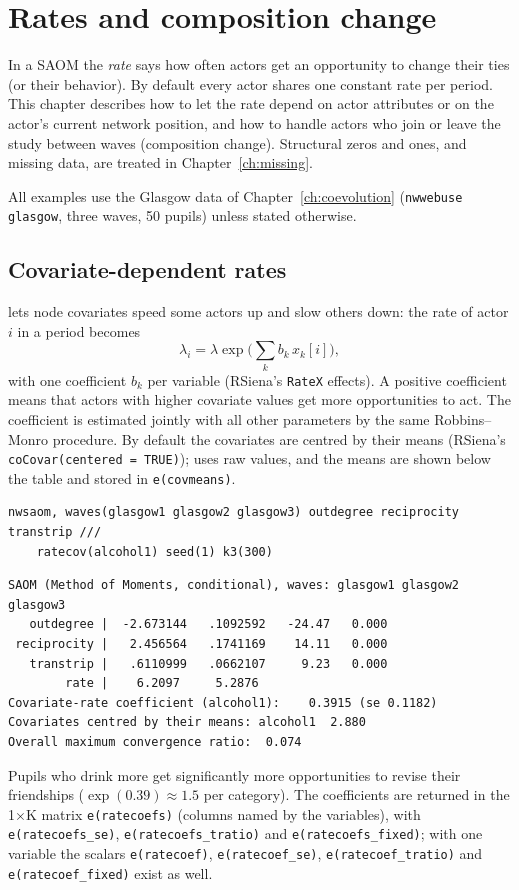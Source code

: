 \chapter{Rates and composition change}\label{ch:rates}
\begingroup\raggedright\sloppy

In a SAOM the \emph{rate} says how often actors get an opportunity to change their ties (or their behavior). By default every actor shares one constant rate per period. This chapter describes how to let the rate depend on actor attributes or on the actor's current network position, and how to handle actors who join or leave the study between waves (composition change). Structural zeros and ones, and missing data, are treated in Chapter~\ref{ch:missing}.

All examples use the Glasgow data of Chapter~\ref{ch:coevolution} (\texttt{nwwebuse glasgow}, three waves, 50 pupils) unless stated otherwise.

\section{Covariate-dependent rates}\label{sec:ratecov}

 lets node covariates speed some actors up and slow others down: the rate of actor $i$ in a period becomes
\[
  \lambda_i = \lambda \exp\Big(\sum_k b_k\,x_k[i]\Big),
\]
with one coefficient $b_k$ per variable (RSiena's \texttt{RateX} effects). A positive coefficient means that actors with higher covariate values get more opportunities to act. The coefficient is estimated jointly with all other parameters by the same Robbins--Monro procedure. By default the covariates are centred by their means (RSiena's \texttt{coCovar(centered = TRUE)});  uses raw values, and the means are shown below the table and stored in \texttt{e(covmeans)}.

\begin{lstlisting}
nwsaom, waves(glasgow1 glasgow2 glasgow3) outdegree reciprocity transtrip ///
    ratecov(alcohol1) seed(1) k3(300)
\end{lstlisting}
\begin{lstlisting}
SAOM (Method of Moments, conditional), waves: glasgow1 glasgow2 glasgow3
   outdegree |  -2.673144   .1092592   -24.47   0.000
 reciprocity |   2.456564   .1741169    14.11   0.000
   transtrip |   .6110999   .0662107     9.23   0.000
        rate |    6.2097     5.2876
Covariate-rate coefficient (alcohol1):    0.3915 (se 0.1182)
Covariates centred by their means: alcohol1  2.880
Overall maximum convergence ratio:  0.074
\end{lstlisting}
Pupils who drink more get significantly more opportunities to revise their friendships ($\exp(0.39)\approx1.5$ per category). The coefficients are returned in the 1$\times$K matrix \texttt{e(ratecoefs)} (columns named by the variables), with \texttt{e(ratecoefs\_se)}, \texttt{e(ratecoefs\_tratio)} and \texttt{e(ratecoefs\_fixed)}; with one variable the scalars \texttt{e(ratecoef)}, \texttt{e(ratecoef\_se)}, \texttt{e(ratecoef\_tratio)} and \texttt{e(ratecoef\_fixed)} exist as well.

